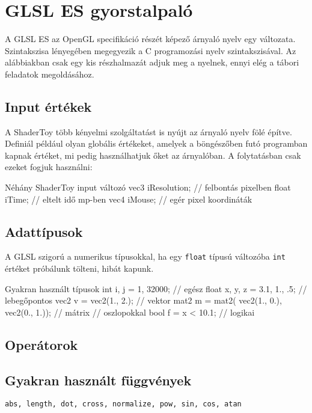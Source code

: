 



\section*{GLSL ES gyorstalpaló}

A GLSL ES az OpenGL specifikáció részét képező árnyaló nyelv egy változata.
Szintakszisa lényegében megegyezik a C programozási nyelv szintakszisával.
Az alábbiakban csak egy kis részhalmazát adjuk meg a nyelnek, ennyi elég a
tábori feladatok megoldásához.

\subsection*{Input értékek}

A ShaderToy több kényelmi szolgáltatást is nyújt az árnyaló nyelv fölé építve. Definiál
például olyan globális értékeket, amelyek a böngészőben futó programban kapnak értéket,
mi pedig használhatjuk őket az árnyalóban. A folytatásban csak ezeket fogjuk használni:

\begin{glsl}{Néhány ShaderToy input változó}
vec3  iResolution; // felbontás pixelben
float iTime;       // eltelt idő mp-ben
vec4  iMouse;      // egér pixel koordináták
\end{glsl}
  
\subsection*{Adattípusok}

A GLSL szigorú a numerikus típusokkal, ha egy \texttt{float} típusú változóba
\texttt{int} értéket próbálunk tölteni, hibát kapunk.

\begin{glsl}{Gyakran használt típusok}
int i, j = 1, 32000;         // egész
float x, y, z = 3.1, 1., .5; // lebegőpontos
vec2  v = vec2(1., 2.);      // vektor
mat2 m = mat2(
    vec2(1., 0.),
    vec2(0., 1.));           // mátrix
                             // oszlopokkal
bool f = x < 10.1;           // logikai 
\end{glsl}

\subsection*{Operátorok}

\subsection*{Gyakran használt függvények}
\texttt{abs, length, dot, cross, normalize, pow, sin, cos, atan}

